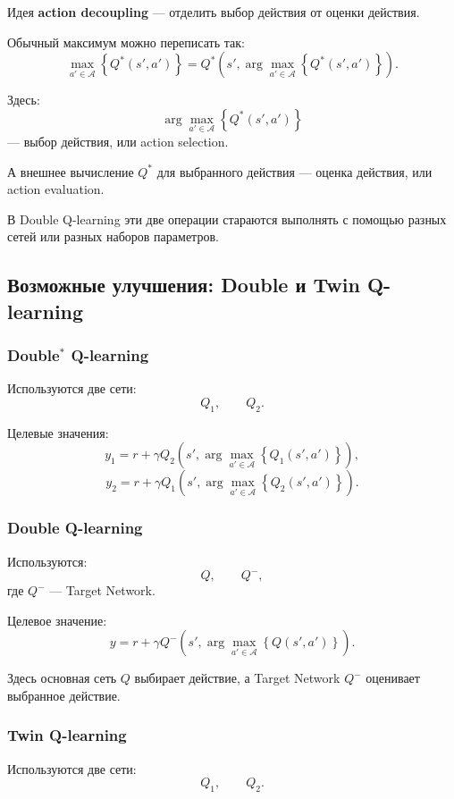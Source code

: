 \documentclass[12pt,a4paper]{article}
\begin{document}
Идея \textbf{action decoupling} --- отделить выбор действия от оценки действия.

Обычный максимум можно переписать так:
\[
\max_{a' \in \mathcal A}
\left\{
Q^\ast(s',a')
\right\}
=
Q^\ast
\left(
s',
\arg\max_{a' \in \mathcal A}
\left\{
Q^\ast(s',a')
\right\}
\right).
\]

Здесь:
\[
\arg\max_{a' \in \mathcal A}
\left\{
Q^\ast(s',a')
\right\}
\]
--- выбор действия, или action selection.

А внешнее вычисление $Q^\ast$ для выбранного действия --- оценка действия, или action evaluation.

В Double Q-learning эти две операции стараются выполнять с помощью разных сетей или разных наборов параметров.

\subsection{Возможные улучшения: Double и Twin Q-learning}

\subsubsection{Double$^\ast$ Q-learning}

Используются две сети:
\[
Q_1,
\qquad
Q_2.
\]

Целевые значения:
\[
y_1
=
r
+
\gamma
Q_2
\left(
s',
\arg\max_{a' \in \mathcal A}
\left\{
Q_1(s',a')
\right\}
\right),
\]
\[
y_2
=
r
+
\gamma
Q_1
\left(
s',
\arg\max_{a' \in \mathcal A}
\left\{
Q_2(s',a')
\right\}
\right).
\]

\subsubsection{Double Q-learning}

Используются:
\[
Q,
\qquad
Q^-,
\]
где $Q^-$ --- Target Network.

Целевое значение:
\[
y
=
r
+
\gamma
Q^-
\left(
s',
\arg\max_{a' \in \mathcal A}
\left\{
Q(s',a')
\right\}
\right).
\]

Здесь основная сеть $Q$ выбирает действие, а Target Network $Q^-$ оценивает выбранное действие.

\subsubsection{Twin Q-learning}

Используются две сети:
\[
Q_1,
\qquad
Q_2.
\]
\end{document}
